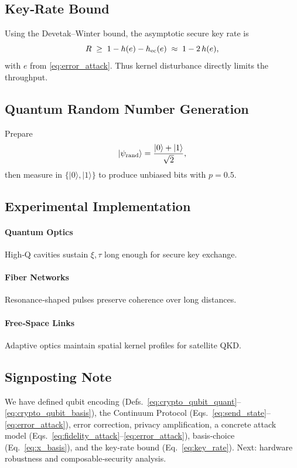 \subsection{Key‐Rate Bound}

Using the Devetak–Winter bound, the asymptotic secure key rate is
\begin{equation}\label{eq:key_rate}
R \;\ge\; 1 - h(e) - h_{\rm ec}(e)
\;\approx\; 1 - 2\,h(e),
\end{equation}
with \(e\) from \eqref{eq:error_attack}.  Thus kernel disturbance directly limits the throughput.

\subsection{Quantum Random Number Generation}

Prepare
\begin{equation}\label{eq:qrng_preparation}
|\psi_{\rm rand}\rangle = \frac{|0\rangle + |1\rangle}{\sqrt2},
\end{equation}
then measure in \(\{|0\rangle,|1\rangle\}\) to produce unbiased bits with \(p=0.5\).

\subsection{Experimental Implementation}

\paragraph{Quantum Optics}  
High‐Q cavities sustain \(\xi,\tau\) long enough for secure key exchange.

\paragraph{Fiber Networks}  
Resonance‐shaped pulses preserve coherence over long distances.

\paragraph{Free‐Space Links}  
Adaptive optics maintain spatial kernel profiles for satellite QKD.

\subsection{Signposting Note}

We have defined qubit encoding (Defs.~\eqref{eq:crypto_qubit_quant}–\eqref{eq:crypto_qubit_basis}), the Continuum Protocol (Eqs.~\eqref{eq:send_state}–\eqref{eq:error_attack}), error correction, privacy amplification, a concrete attack model (Eqs.~\eqref{eq:fidelity_attack}–\eqref{eq:error_attack}), basis‐choice (Eq.~\eqref{eq:x_basis}), and the key‐rate bound (Eq.~\eqref{eq:key_rate}). Next: hardware robustness and composable‐security analysis.

